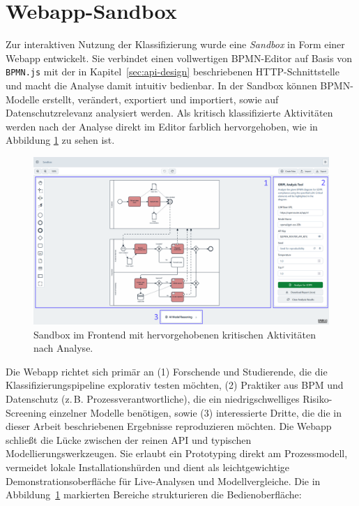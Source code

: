 \section{Webapp-Sandbox}\label{sec:nutzung-uber-webapp}

Zur interaktiven Nutzung der Klassifizierung wurde eine \emph{Sandbox} in Form einer Webapp entwickelt. Sie verbindet einen vollwertigen \ac{BPMN}-Editor auf Basis von \texttt{BPMN.js} \cite{bpmn-js} mit der in Kapitel~\ref{sec:api-design} beschriebenen HTTP-Schnittstelle und macht die Analyse damit intuitiv bedienbar. In der Sandbox können \ac{BPMN}-Modelle erstellt, verändert, exportiert und importiert, sowie auf Datenschutzrelevanz analysiert werden. Als kritisch klassifizierte Aktivitäten werden nach der Analyse direkt im Editor farblich hervorgehoben, wie in Abbildung \ref{fig:sandbox-frontend-analyzed-model} zu sehen ist.

\begin{figure}[h]
    \centering
    \includegraphics[width=\linewidth]{images/sandbox/sandbox-analyzed-model-annotated}
    \caption{Sandbox im Frontend mit hervorgehobenen kritischen Aktivitäten nach Analyse.}
    \label{fig:sandbox-frontend-analyzed-model}
\end{figure}

Die Webapp richtet sich primär an (1) Forschende und Studierende, die die Klassifizierungspipeline explorativ testen möchten, (2) Praktiker aus \ac{BPM} und Datenschutz (z.\,B. Prozessverantwortliche), die ein niedrigschwelliges Risiko-Screening einzelner Modelle benötigen, sowie (3) interessierte Dritte, die die in dieser Arbeit beschriebenen Ergebnisse reproduzieren möchten. Die Webapp schließt die Lücke zwischen der reinen API und typischen Modellierungswerkzeugen. Sie erlaubt ein Prototyping direkt am Prozessmodell, vermeidet lokale Installationshürden und dient als leichtgewichtige Demonstrationsoberfläche für Live-Analysen und Modellvergleiche.
Die in Abbildung~\ref{fig:sandbox-frontend-analyzed-model} markierten Bereiche strukturieren die Bedienoberfläche:


